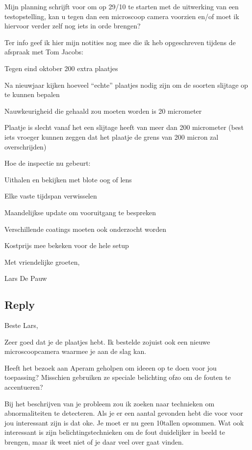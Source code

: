 \documentclass{scrartcl}
\begin{document}
 

Mijn planning schrijft voor om op 29/10 te starten met de uitwerking van een testopstelling, kan u tegen dan een microscoop camera voorzien en/of moet ik hiervoor verder zelf nog iets in orde brengen?

 

Ter info geef ik hier mijn notities nog mee die ik heb opgeschreven tijdens de afspraak met Tom Jacobs:

Tegen eind oktober 200 extra plaatjes

Na nieuwjaar kijken hoeveel “echte” plaatjes nodig zijn om de soorten slijtage op te kunnen bepalen

Nauwkeurigheid die gehaald zou moeten worden is 20 micrometer

Plaatje is slecht vanaf het een slijtage heeft van meer dan 200 micrometer (best iets vroeger kunnen zeggen dat het plaatje de grens van 200 micron zal overschrijden)

Hoe de inspectie nu gebeurt:

Uithalen en bekijken met blote oog of lens

Elke vaste tijdspan verwisselen

Maandelijkse update om vooruitgang te bespreken

Verschillende coatings moeten ook onderzocht worden

Kostprijs mee bekeken voor de hele setup

 

Met vriendelijke groeten,

 

Lars De Pauw



\subsection{Reply}

Beste Lars,



Zeer goed dat je de plaatjes hebt. Ik bestelde zojuist ook een nieuwe microscoopcamera waarmee je aan de slag kan.



Heeft het bezoek aan Aperam geholpen om ideeen op te doen voor jou toepassing? Misschien gebruiken ze speciale belichting ofzo om de fouten te accentueren?



Bij het beschrijven van je probleem zou ik zoeken naar technieken om abnormaliteiten te detecteren. Als je er een aantal gevonden hebt die voor voor jou interessant zijn is dat oke. Je moet er nu geen 10tallen opsommen. Wat ook interessant is zijn belichtingstechnieken om de fout duidelijker in beeld te brengen, maar ik weet niet of je daar veel over gaat vinden.
\end{document}

